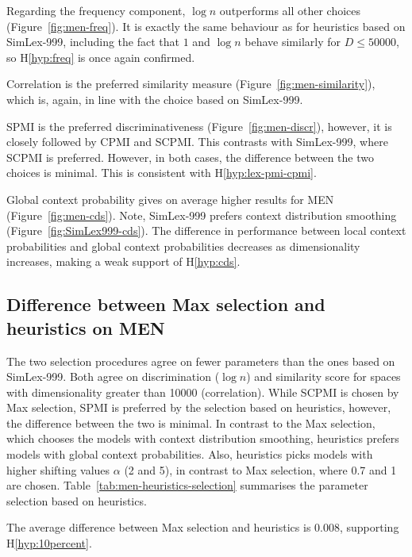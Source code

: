 Regarding the frequency component, $\log n$ outperforms all other choices (Figure~\ref{fig:men-freq}). It is exactly the same behaviour as for heuristics based on SimLex-999, including the fact that $1$ and $\log n$ behave similarly for $D \leq 50000$, so H\ref{hyp:freq} is once again confirmed.


Correlation is the preferred similarity measure (Figure~\ref{fig:men-similarity}), which is, again, in line with the choice based on SimLex-999.

SPMI is the preferred discriminativeness (Figure~\ref{fig:men-discr}), however, it is closely followed by CPMI and SCPMI. This contrasts with SimLex-999, where SCPMI is preferred. However, in both cases, the difference between the two choices is minimal. This is consistent with H\ref{hyp:lex-pmi-cpmi}.


Global context probability gives on average higher results for MEN (Figure~\ref{fig:men-cds}). Note, SimLex-999 prefers context distribution smoothing (Figure~\ref{fig:SimLex999-cds}). The difference in performance between local context probabilities and global context probabilities decreases as dimensionality increases, making a weak support of H\ref{hyp:cds}.

\subsection{Difference between Max selection and heuristics on MEN}

The two selection procedures agree on fewer parameters than the ones based on SimLex-999. Both agree on discrimination ($\log n$) and similarity score for spaces with dimensionality greater than 10000 (correlation). While SCPMI is chosen by Max selection, SPMI is preferred by the selection based on heuristics, however, the difference between the two is minimal. In contrast to the Max selection, which chooses the models with context distribution smoothing, heuristics prefers models with global context probabilities. Also, heuristics picks models with higher shifting values $\alpha$ (2 and 5), in contrast to Max selection, where 0.7 and 1 are chosen. Table~\ref{tab:men-heuristics-selection} summarises the parameter selection based on heuristics.

The average difference between Max selection and heuristics is 0.008, supporting H\ref{hyp:10percent}.
%
%
%

